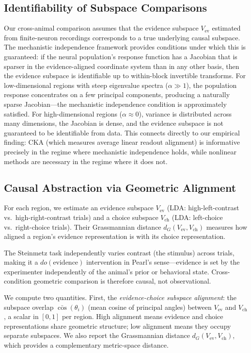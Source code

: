 \documentclass{article}
\begin{document}
\subsection{Identifiability of Subspace Comparisons}

Our cross-animal comparison assumes that the evidence subspace $V_{\text{ev}}$ estimated from finite-neuron recordings corresponds to a true underlying causal subspace. The mechanistic independence framework \citep{sid2026mechanistic} provides conditions under which this is guaranteed: if the neural population's response function has a Jacobian that is sparser in the evidence-aligned coordinate system than in any other basis, then the evidence subspace is identifiable up to within-block invertible transforms. For low-dimensional regions with steep eigenvalue spectra ($\alpha \gg 1$), the population response concentrates on a few principal components, producing a naturally sparse Jacobian---the mechanistic independence condition is approximately satisfied. For high-dimensional regions ($\alpha \approx 0$), variance is distributed across many dimensions, the Jacobian is dense, and the evidence subspace is not guaranteed to be identifiable from data. This connects directly to our empirical finding: CKA (which measures average linear readout alignment) is informative precisely in the regime where mechanistic independence holds, while nonlinear methods are necessary in the regime where it does not.

\subsection{Causal Abstraction via Geometric Alignment}

For each region, we estimate an evidence subspace $V_{\text{ev}}$ (LDA: high-left-contrast vs.\ high-right-contrast trials) and a choice subspace $V_{\text{ch}}$ (LDA: left-choice vs.\ right-choice trials). Their Grassmannian distance $d_G(V_{\text{ev}}, V_{\text{ch}})$ measures how aligned a region's evidence representation is with its choice representation.

The Steinmetz task independently varies contrast (the stimulus) across trials, making it a $do(\text{evidence})$ intervention in Pearl's sense---evidence is set by the experimenter independently of the animal's prior or behavioral state. Cross-condition geometric comparison is therefore causal, not observational.

We compute two quantities. First, the \emph{evidence-choice subspace alignment}: the subspace overlap $\bar{\cos}(\theta_i)$ (mean cosine of principal angles) between $V_{\text{ev}}$ and $V_{\text{ch}}$, a scalar in $[0, 1]$ per region. High alignment means evidence and choice representations share geometric structure; low alignment means they occupy separate subspaces. We also report the Grassmannian distance $d_G(V_{\text{ev}}, V_{\text{ch}})$, which provides a complementary metric-space distance.
\end{document}
